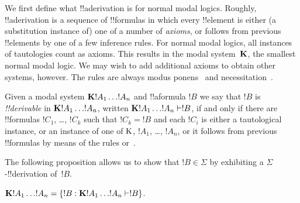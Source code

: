 \documentclass[../../../include/open-logic-section]{subfiles}
\begin{document}


We first define what !!a{derivation} is for normal modal
logics. Roughly, !!a{derivation} is a sequence of !!{formula}s in
which every !!{element} is either (a substitution instance of) one of
a number of \emph{axioms}, or follows from previous !!{element}s by
one of a few inference rules. For normal modal logics, all instances
of tautologies
count as axioms. This results in the modal system~$\Log{K}$, the
smallest normal modal logic. We may wish to add additional axioms to
obtain other systems, however. The rules are always modus ponens~\MP{}
and necessitation~\Nec.

\begin{defn}
  Given a modal system $\Log{K} !A_1 \dots !A_n$ and !!a{formula} $!B$
  we say that $!B$ is \emph{!!{derivable}} in $\Log{K} !A_1 \dots
  !A_n$, written $\Log{K} !A_1 \dots !A_n \Proves !B$, if and only if
  there are !!{formula}s $!C_1$, \dots, $!C_k$ such that $!C_k = !B$
  and each $!C_i$ is either a tautological instance, or an instance of
  one of $\mathrm{K}$, $!A_1$,
  \dots, $!A_n$, or it follows from previous !!{formula}s by means of
  the rules \MP{} or~\Nec.
\end{defn}

The following proposition allows us to show that $!B \in \Sigma$
by exhibiting a $\Sigma$-!!{derivation} of~$!B$.

\begin{prop}
  $\Log{K} !A_1 \dots !A_n = \Setabs{!B}{\Log{K} !A_1 \dots !A_n \Proves !B}$.
\end{prop}
\end{document}
